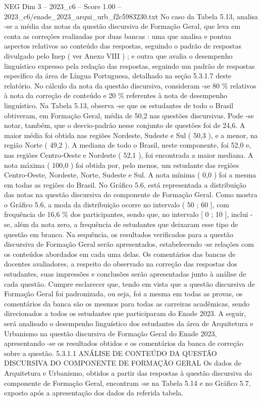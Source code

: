\begin{textsample}{NEG Dim 3 – 2023\_c6 – Score 1.00 – 2023\_c6/enade\_2023\_arqui\_urb\_f2c5983230.txt}
No caso da Tabela 5.13, analisa -se a média das notas da questão discursiva de Formação Geral, que leva em conta as correções realizadas por duas bancas : uma que analisa e pontua aspectos relativos ao conteúdo das respostas, seguindo o padrão de respostas divulgado pelo Inep ( ver Anexo VIII ) ; e outra que avalia o desempenho linguístico expresso pela redação das respostas, seguindo um padrão de respostas específico da área de Língua Portuguesa, detalhado na seção 5.3.1.7 deste relatório.
No cálculo da nota da questão discursiva, consideram -se 80 \% relativos à nota da correção de conteúdo e 20 \% referentes à nota de desempenho linguístico.
Na Tabela 5.13, observa -se que os estudantes de todo o Brasil obtiveram, em Formação Geral, média de 50,2 nas questões discursivas.
Pode -se notar, também, que o desvio-padrão nesse conjunto de questões foi de 24,6.
A maior média foi obtida nas regiões Nordeste, Sudeste e Sul ( 50,3 ), e a menor, na região Norte ( 49,2 ).
A mediana de todo o Brasil, neste componente, foi 52,0 e, nas regiões Centro-Oeste e Nordeste ( 52,1 ), foi encontrada a maior mediana.
A nota máxima ( 100,0 ) foi obtida por, pelo menos, um estudante das regiões Centro-Oeste, Nordeste, Norte, Sudeste e Sul.
A nota mínima ( 0,0 ) foi a mesma em todas as regiões do Brasil.
No Gráfico 5.6, está representada a distribuição das notas na questão discursiva do componente de Formação Geral.
Como mostra o Gráfico 5.6, a moda da distribuição ocorre no intervalo ( 50 ; 60 ], com frequência de 16,6 \% dos participantes, sendo que, no intervalo [ 0 ; 10 ], inclui -se, além da nota zero, a frequência de estudantes que deixaram esse tipo de questão em branco.
Na sequência, os resultados verificados para a questão discursiva de Formação Geral serão apresentados, estabelecendo -se relações com os conteúdos abordados em cada uma delas.
Os comentários das bancas de docentes avaliadores, a respeito do observado na correção das respostas dos estudantes, suas impressões e conclusões serão apresentadas junto à análise de cada questão.
Cumpre esclarecer que, tendo em vista que a questão discursiva de Formação Geral foi padronizada, ou seja, foi a mesma em todas as provas, os comentários da banca são os mesmos para todas as carreiras acadêmicas, sendo direcionados a todos os estudantes que participaram do Enade 2023.
A seguir, será analisado o desempenho linguístico dos estudantes da área de Arquitetura e Urbanismo na questão discursiva de Formação Geral do Enade 2023, apresentando -se os resultados obtidos e os comentários da banca de correção sobre a questão. 5.3.1.1 ANÁLISE DE CONTEÚDO DA QUESTÃO DISCURSIVA DO COMPONENTE DE FORMAÇÃO GERAL Os dados de Arquitetura e Urbanismo, obtidos a partir das respostas à questão discursiva do componente de Formação Geral, encontram -se na Tabela 5.14 e no Gráfico 5.7, exposto após a apresentação dos dados da referida tabela.

\end{textsample}
